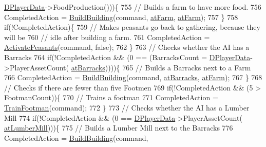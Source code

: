 \begin{DoxyCode}
      \hyperlink{classCAIPlayer_a83b5113c8f7e80df54940b647c5ee2e6}{DPlayerData}->FoodProduction()))\{
755                 \textcolor{comment}{// Builds a farm to have more food.}
756                 CompletedAction = \hyperlink{classCAIPlayer_a2ff5263cbaa6bfc62ffec4dbce87ba88}{BuildBuilding}(command, \hyperlink{GameDataTypes_8h_a5600d4fc433b83300308921974477feca406eab24dcbad1858522aca11b1088f5}{atFarm}, 
      \hyperlink{GameDataTypes_8h_a5600d4fc433b83300308921974477feca406eab24dcbad1858522aca11b1088f5}{atFarm});
757             \}
758             \textcolor{keywordflow}{if}(!CompletedAction)\{
759                 \textcolor{comment}{// Makes peasants go back to gathering, because they will be}
760                 \textcolor{comment}{// idle after building a farm.}
761                 CompletedAction = \hyperlink{classCAIPlayer_a3fab1c955fd68bb53fa80bb1872d2819}{ActivatePeasants}(command, \textcolor{keyword}{false});
762             \}
763             \textcolor{comment}{// Checks whether the AI has a Barracks}
764             \textcolor{keywordflow}{if}(!CompletedAction && (0 == (BarracksCount = \hyperlink{classCAIPlayer_a83b5113c8f7e80df54940b647c5ee2e6}{DPlayerData}->PlayerAssetCount(
      \hyperlink{GameDataTypes_8h_a5600d4fc433b83300308921974477feca1cbf6c944f30d615a247eef1f57b2230}{atBarracks}))))\{
765                 \textcolor{comment}{// Builds a Barracks next to a Farm}
766                 CompletedAction = \hyperlink{classCAIPlayer_a2ff5263cbaa6bfc62ffec4dbce87ba88}{BuildBuilding}(command, \hyperlink{GameDataTypes_8h_a5600d4fc433b83300308921974477feca1cbf6c944f30d615a247eef1f57b2230}{atBarracks}, 
      \hyperlink{GameDataTypes_8h_a5600d4fc433b83300308921974477feca406eab24dcbad1858522aca11b1088f5}{atFarm});
767             \}
768             \textcolor{comment}{// Checks if there are fewer than five Footmen}
769             \textcolor{keywordflow}{if}(!CompletedAction && (5 > FootmanCount))\{
770                 \textcolor{comment}{// Trains a footman}
771                 CompletedAction = \hyperlink{classCAIPlayer_aa3f9c1d0d449a45a24e065d2086527b0}{TrainFootman}(command);
772             \}
773             \textcolor{comment}{// Checks whether the AI has a Lumber Mill}
774             \textcolor{keywordflow}{if}(!CompletedAction && (0 == \hyperlink{classCAIPlayer_a83b5113c8f7e80df54940b647c5ee2e6}{DPlayerData}->PlayerAssetCount(
      \hyperlink{GameDataTypes_8h_a5600d4fc433b83300308921974477feca7bb38316bc3193b5c9ec67ea6aad549c}{atLumberMill})))\{
775                 \textcolor{comment}{// Builds a Lumber Mill next to the Barracks}
776                 CompletedAction = \hyperlink{classCAIPlayer_a2ff5263cbaa6bfc62ffec4dbce87ba88}{BuildBuilding}(command, 

\end{DoxyCode}
